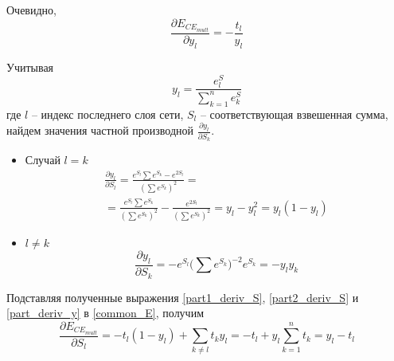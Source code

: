 Очевидно, 
\begin{equation}
	\label{part_deriv_y}
	\frac{\partial E_{CE_{mult}}}{\partial y_l} = -\frac{t_l}{y_l}
\end{equation}

Учитывая
\begin{equation}
	y_l = \frac{e^S_l}{\sum_{k=1}^{n} e^S_k}
\end{equation}
где $l$ -- индекс последнего слоя сети, $S_l$ -- соответствующая взвешенная сумма, найдем значения частной производной $\frac{\partial y_l}{\partial S_k}$.
\begin{itemize}
	\item Случай $l = k$
	\begin{multline}
		\label{part1_deriv_S}
		\frac{\partial y_l}{\partial S_l} = \frac{e^{S_l}\sum e^{S_k} - e^{2S_l}}{(\sum e^{S_k})^2} = \\ = \frac{e^{S_l}\sum e^{S_k}}{(\sum e^{S_k})^2}-\frac{e^{2S_l}}{(\sum e^{S_k})^2}=y_l - y_l^2 = y_l(1-y_l)
	\end{multline}
	\item $l \neq k$
	\begin{equation}
		\label{part2_deriv_S}
		\frac{\partial y_l}{\partial S_k} = -e^{S_l}\Big(\sum e^{S_k}\Big)^{-2}e^{S_k} = -y_ly_k
	\end{equation}
\end{itemize}

Подставляя полученные выражения \ref{part1_deriv_S}, \ref{part2_deriv_S} и \ref{part_deriv_y} в \ref{common_E}, получим
\begin{equation}
	\frac{\partial E_{CE_{mult}}}{\partial S_l} = -t_l(1-y_l) + \sum_{k\neq l}t_ky_l = -t_l + y_l\sum_{k=1}^{n}t_k = y_l - t_l
\end{equation}

%